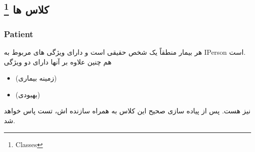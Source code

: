     \subsection{کلاس ها
    \footnote{Classes}
    }
        \subsubsection{Patient}
        هر بیمار منطقاً یک شخص حقیقی است و دارای ویژگی های مربوط به 
        IPerson
        است.
        \\
        هم چنین علاوه بر آنها دارای دو ویژگی 
        \begin{itemize}
        \item 
            (زمینه بیماری)
        \item
            (بهبودی)
        \end{itemize}
        نیز هست.
        پس از پیاده سازی صحیح این کلاس به همراه سازنده اش،
        تست
        \grayBox{\textcolor{dkgreen}{PatientClassTests}}
        پاس خواهد شد.
        
